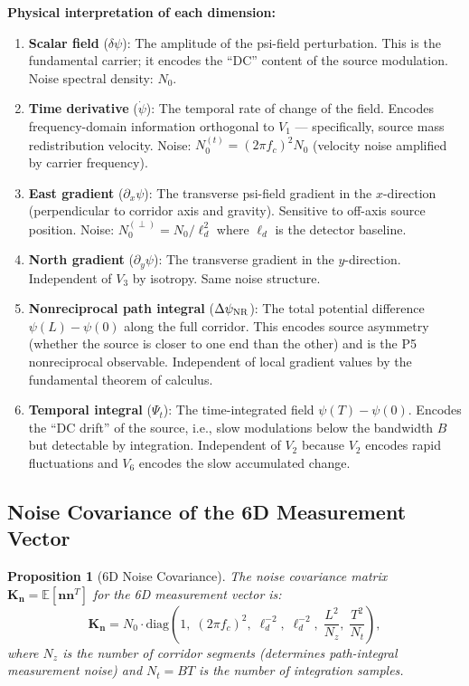 \documentclass[aps,prd,twocolumn,superscriptaddress,nofootinbib]{revtex4-2}
\newtheorem{proposition}[theorem]{Proposition}
\begin{document}
\textbf{Physical interpretation of each dimension:}
\begin{enumerate}
\item[$V_1$] \textbf{Scalar field} ($\delta\psi$): The amplitude of the
psi-field perturbation. This is the fundamental carrier; it encodes the
``DC'' content of the source modulation. Noise spectral density: $N_0$.
\item[$V_2$] \textbf{Time derivative} ($\dot\psi$): The temporal rate of
change of the field. Encodes frequency-domain information orthogonal to $V_1$
--- specifically, source mass redistribution velocity. Noise: $N_0^{(t)}
= (2\pi f_c)^2 N_0$ (velocity noise amplified by carrier frequency).
\item[$V_3$] \textbf{East gradient} ($\partial_x \psi$): The transverse
psi-field gradient in the $x$-direction (perpendicular to corridor axis
and gravity). Sensitive to off-axis source position. Noise: $N_0^{(\perp)}
= N_0/\ell_d^2$ where $\ell_d$ is the detector baseline.
\item[$V_4$] \textbf{North gradient} ($\partial_y \psi$): The transverse
gradient in the $y$-direction. Independent of $V_3$ by isotropy. Same
noise structure.
\item[$V_5$] \textbf{Nonreciprocal path integral} ($\Delta\psi_{\rm NR}$):
The total potential difference $\psi(L) - \psi(0)$ along the full corridor.
This encodes source asymmetry (whether the source is closer to one end than
the other) and is the P5 nonreciprocal observable. Independent of local
gradient values by the fundamental theorem of calculus.
\item[$V_6$] \textbf{Temporal integral} ($\Psi_t$): The time-integrated
field $\psi(T) - \psi(0)$. Encodes the ``DC drift'' of the source, i.e.,
slow modulations below the bandwidth $B$ but detectable by integration.
Independent of $V_2$ because $V_2$ encodes rapid fluctuations and $V_6$
encodes the slow accumulated change.
\end{enumerate}

\subsection{Noise Covariance of the 6D Measurement Vector}

\begin{proposition}[6D Noise Covariance]
\label{prop:noise-cov}
The noise covariance matrix $\mathbf{K}_{\mathbf{n}} = \mathbb{E}[\mathbf{n}\mathbf{n}^T]$
for the 6D measurement vector is:
\begin{equation}
\mathbf{K}_{\mathbf{n}} = N_0 \cdot \mathrm{diag}\!\left(
1,\; (2\pi f_c)^2,\; \ell_d^{-2},\; \ell_d^{-2},\;
\frac{L^2}{N_z},\; \frac{T^2}{N_t}
\right),
\label{eq:noise-cov}
\end{equation}
where $N_z$ is the number of corridor segments (determines path-integral
measurement noise) and $N_t = BT$ is the number of integration samples.
\end{proposition}
\end{document}
